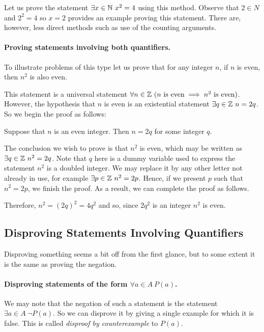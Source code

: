 Let us prove the statement $\exists x \in \mathbb{N} \ x^2 = 4$ using this method.
Observe that $2 \in N$ and $2^2 = 4$ so $x = 2$ provides an example proving
this statement. There are, however, less direct methods such as use of the
counting arguments.

\paragraph{Proving statements involving both quantifiers.}
To illustrate problems of this type let us prove that for any integer $n$, if
$n$ is even, then $n^2$ is also even.

This statement is a universal statement $\forall n \in \mathbb{Z} \ (n \text{ is even}
\implies n^2 \text{ is even})$. However, the hypothesis that $n$ is even is an
existential statement $\exists q \in \mathbb{Z} \ n = 2q$. So we begin the proof as
follows:
\begin{center}
  Suppose that $n$ is an even integer. Then $n = 2q$ for some integer $q$.
\end{center}
The conclusion we wish to prove is that $n^2$ is even, which may be written as
$\exists q \in \mathbb{Z} \ n^2 = 2q$. Note that $q$ here is a dummy variable used to
express the statement $n^2$ is a doubled integer. We may replace it by any
other letter not already in use, for example $\exists p \in \mathbb{Z} \ n^2 = 2p$.
Hence, if we present $p$ such that $n^2 = 2p$, we finish the proof. As a result,
we can complete the proof as follows.
\begin{center}
  Therefore, $n^2 = (2q)^2 = 4q^2$ and so, since $2q^2$ is an integer $n^2$ is
  even.
\end{center}

\subsection{Disproving Statements Involving Quantifiers}
Disproving something seems a bit off from the first glance, but to some extent
it is the same as proving the negation.

\paragraph{Disproving statements of the form $\forall a \in A \ P(a)$.}
We may note that the negation of such a statement is the statement $\exists a
\in A \ \lnot P(a)$. So we can disprove it by giving a single example for which
it is false. This is called \emph{disproof by counterexample} to $P(a)$.


